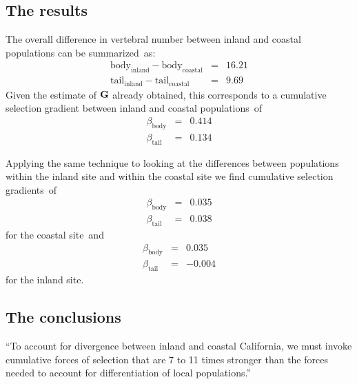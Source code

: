 \documentclass[12pt]{article}
\begin{document}
\subsection*{The results}

The overall difference in vertebral number between inland and coastal
populations can be summarized~as:
\begin{eqnarray*}
\mbox{body}_{\mbox{inland}} - \mbox{body}_{\mbox{coastal}} &=& 16.21 \\
\mbox{tail}_{\mbox{inland}} - \mbox{tail}_{\mbox{coastal}} &=& 9.69
\end{eqnarray*}
Given the estimate of $\bf G$ already obtained, this corresponds to a
cumulative selection gradient between inland and coastal
populations~of
\begin{eqnarray*}
\beta_{\mbox{body}} &=& 0.414 \\
\beta_{\mbox{tail}} &=& 0.134
\end{eqnarray*}

Applying the same technique to looking at the differences between
populations within the inland site and within the coastal site we find
cumulative selection gradients~of
\begin{eqnarray*}
\beta_{\mbox{body}} &=& 0.035 \\
\beta_{\mbox{tail}} &=& 0.038
\end{eqnarray*}
for the coastal site~and
\begin{eqnarray*}
\beta_{\mbox{body}} &=& 0.035 \\
\beta_{\mbox{tail}} &=& -0.004
\end{eqnarray*}
for the inland site.

\subsection*{The conclusions}

``To account for divergence between inland and coastal California, we
must invoke cumulative forces of selection that are 7 to 11 times
stronger than the forces needed to account for differentiation of
local populations.''
\end{document}
